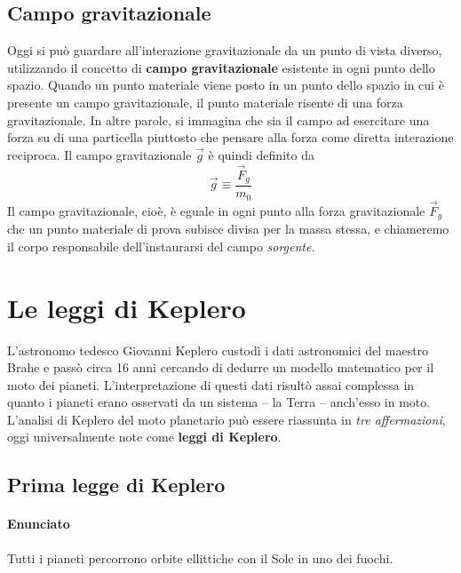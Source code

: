 \documentclass[a4paper,11pt,oneside]{book}
\begin{document}
\subsection{Campo gravitazionale}
Oggi si può guardare all’interazione gravitazionale da un punto di vista diverso, utilizzando il concetto di \textbf{campo gravitazionale} esistente in ogni punto dello spazio.
Quando un punto materiale viene posto in un punto dello spazio in cui è presente un campo gravitazionale, il punto materiale risente di una forza gravitazionale. In altre parole, 
si immagina che sia il campo ad esercitare una forza su di una particella piuttosto che pensare alla forza come diretta interazione reciproca.
Il campo gravitazionale $\vec{g}$ è quindi definito da
\begin{equation*}
    \vec{g} \equiv \frac{\vec{F}_g}{m_0}
\end{equation*}
Il campo gravitazionale, cioè, è eguale in ogni punto alla forza gravitazionale $\vec{F}_g$ che un punto materiale di prova subisce divisa per la massa stessa, e 
chiameremo il corpo responsabile dell’instaurarsi del campo \emph{sorgente}.

\section{Le leggi di Keplero}
L’astronomo tedesco Giovanni Keplero custodì i dati astronomici del maestro Brahe e passò circa 16 anni cercando di dedurre un modello matematico per 
il moto dei pianeti. L’interpretazione di questi dati risultò assai complessa in quanto i pianeti erano osservati da un sistema – la Terra – anch’esso in moto.
L’analisi di Keplero del moto planetario può essere riassunta in \emph{tre affermazioni}, oggi universalmente note come \textbf{leggi di Keplero}.
\subsection{Prima legge di Keplero}

\paragraph{Enunciato} Tutti i pianeti percorrono orbite ellittiche con il Sole in uno dei fuochi.
\end{document}
